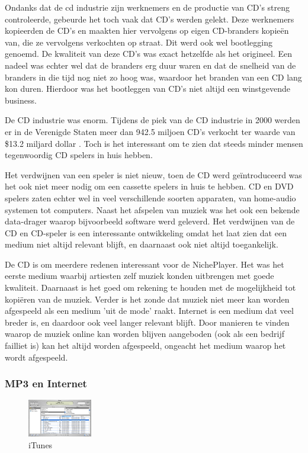 Ondanks dat de cd industrie zijn werknemers en de productie van CD's streng controleerde, gebeurde het toch vaak dat CD's werden gelekt. Deze werknemers kopieerden de CD's en maakten hier vervolgens op eigen CD-branders kopieën van, die ze vervolgens verkochten op straat. Dit werd ook wel bootlegging genoemd. De kwaliteit van deze CD's was exact hetzelfde als het origineel. Een nadeel was echter wel dat de branders erg duur waren en dat de snelheid van de branders in die tijd nog niet zo hoog was, waardoor het branden van een CD lang kon duren. Hierdoor was het bootleggen van CD's niet altijd een winstgevende business.

De CD industrie was enorm. Tijdens de piek van de CD industrie in 2000 werden er in de Verenigde Staten meer dan 942.5 miljoen CD's verkocht ter waarde van \$13.2 miljard dollar \citep{riaa2022salesdatabase}. Toch is het interessant om te zien dat steeds minder mensen tegenwoordig CD spelers in huis hebben.

Het verdwijnen van een speler is niet nieuw, toen de CD werd geïntroduceerd was het ook niet meer nodig om een cassette spelers in huis te hebben. CD en DVD spelers zaten echter wel in veel verschillende soorten apparaten, van home-audio systemen tot computers. Naast het afspelen van muziek was het ook een bekende data-drager waarop bijvoorbeeld software werd geleverd. Het verdwijnen van de CD en CD-speler is een interessante ontwikkeling omdat het laat zien dat een medium niet altijd relevant blijft, en daarnaast ook niet altijd toegankelijk.

De CD is om meerdere redenen interessant voor de NichePlayer. Het was het eerste medium waarbij artiesten zelf muziek konden uitbrengen met goede kwaliteit. Daarnaast is het goed om rekening te houden met de mogelijkheid tot kopiëren van de muziek. Verder is het zonde dat muziek niet meer kan worden afgespeeld als een medium 'uit de mode' raakt. Internet is een medium dat veel breder is, en daardoor ook veel langer relevant blijft. Door manieren te vinden waarop de muziek online kan worden blijven aangeboden (ook als een bedrijf failliet is) kan het altijd worden afgespeeld, ongeacht het medium waarop het wordt afgespeeld.

\subsubsection*{MP3 en Internet}
\begin{figure}
    \centering
    \includegraphics[width=0.25\textwidth]{assets/critical-review/iTunes_v1.jpeg}
    \caption{iTunes}
    \label{fig:critical-review:iTunes}
\end{figure}

